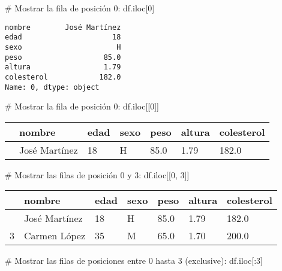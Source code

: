 \documentclass[
  letterpaper,
  DIV=11,
  numbers=noendperiod]{scrreprt}
\newenvironment{Shaded}{\begin{snugshade}}{\end{snugshade}}
\newcommand{\CommentTok}[1]{\textcolor[rgb]{0.37,0.37,0.37}{#1}}
\newcommand{\DecValTok}[1]{\textcolor[rgb]{0.68,0.00,0.00}{#1}}
\newcommand{\NormalTok}[1]{\textcolor[rgb]{0.00,0.23,0.31}{#1}}
\begin{document}
\begin{Shaded}
\begin{Highlighting}[]
\CommentTok{\# Mostrar la fila de posición 0:}
\NormalTok{df.iloc[}\DecValTok{0}\NormalTok{]}
\end{Highlighting}
\end{Shaded}

\begin{verbatim}
nombre        José Martínez
edad                     18
sexo                      H
peso                   85.0
altura                 1.79
colesterol            182.0
Name: 0, dtype: object
\end{verbatim}

\begin{Shaded}
\begin{Highlighting}[]
\CommentTok{\# Mostrar la fila de posición 0:}
\NormalTok{df.iloc[[}\DecValTok{0}\NormalTok{]]}
\end{Highlighting}
\end{Shaded}

\begin{longtable}[]{@{}lllllll@{}}
\toprule\noalign{}
& nombre & edad & sexo & peso & altura & colesterol \\
\midrule\noalign{}
\endhead
\bottomrule\noalign{}
\endlastfoot
0 & José Martínez & 18 & H & 85.0 & 1.79 & 182.0 \\
\end{longtable}

\begin{Shaded}
\begin{Highlighting}[]
\CommentTok{\# Mostrar las filas de posición 0 y 3:}
\NormalTok{df.iloc[[}\DecValTok{0}\NormalTok{, }\DecValTok{3}\NormalTok{]]}
\end{Highlighting}
\end{Shaded}

\begin{longtable}[]{@{}lllllll@{}}
\toprule\noalign{}
& nombre & edad & sexo & peso & altura & colesterol \\
\midrule\noalign{}
\endhead
\bottomrule\noalign{}
\endlastfoot
0 & José Martínez & 18 & H & 85.0 & 1.79 & 182.0 \\
3 & Carmen López & 35 & M & 65.0 & 1.70 & 200.0 \\
\end{longtable}

\begin{Shaded}
\begin{Highlighting}[]
\CommentTok{\# Mostrar las filas de posiciones entre 0 hasta 3 (exclusive):}
\NormalTok{df.iloc[:}\DecValTok{3}\NormalTok{]}
\end{Highlighting}
\end{Shaded}
\end{document}
